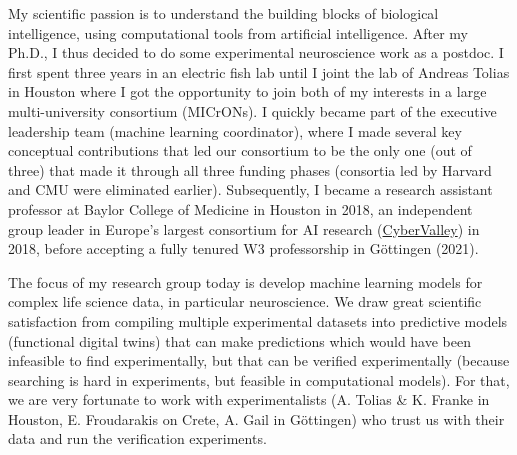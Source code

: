\documentclass[COG,11pt]{ercgrant}
\begin{document}
My scientific passion is to understand the building blocks of biological intelligence, using computational tools from artificial intelligence. After my Ph.D., I thus decided to do some experimental neuroscience work as a postdoc. I first spent three years in an electric fish lab until I joint the lab of Andreas Tolias in Houston where I got the opportunity to join both of my interests in a large multi-university consortium (MICrONs). I quickly became part of the executive leadership team (machine learning coordinator), where I made several key conceptual contributions that led our consortium to be the only one (out of three) that made it through all three funding phases (consortia led by Harvard and CMU were eliminated earlier). Subsequently, I became a research assistant professor at Baylor College of Medicine in Houston in 2018, an independent group leader in Europe's largest consortium for AI research  (\href{https://cyber-valley.de/}{CyberValley}) in 2018, before accepting a fully tenured W3 professorship in Göttingen (2021).

The focus of my research group today is develop machine learning models for complex life science data, in particular neuroscience. We draw great scientific satisfaction from compiling multiple experimental datasets into predictive models (functional digital twins) that can make predictions which would have been infeasible to find experimentally, but that can be verified experimentally (because searching is hard in experiments, but feasible in computational models). For that, we are very fortunate to work with experimentalists (A. Tolias \& K. Franke in Houston, E. Froudarakis on Crete, A. Gail in Göttingen) who trust us with their data and run the verification experiments.
\end{document}
